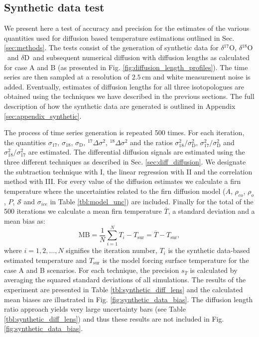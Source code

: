 \documentclass[11pt, draftcls, onecolumn]{IEEEtran} %
\numberwithin{equation}{section}
\numberwithin{table}{section}
\numberwithin{figure}{section}
\newcommand{\delOx}{$\delta{}^{18}\mathrm{O}$}
\newcommand{\delOxb}{$\delta{}^{17}\mathrm{O}$}
\newcommand{\delD}{$\delta\mathrm{D}$}
\begin{document}
\subsection{Synthetic data test} \label{sec:synthetic_results}
We present here a test of accuracy and precision for the estimates of the various 
quantities used for diffusion based temperature estimations outlined in Sec. \ref{sec:methods}. The tests consist of the generation of
synthetic data for \delOxb, \delOx~and \delD~and subsequent numerical diffusion with diffusion 
lengths as calculated for case A and B (as presented in Fig. \ref{fig:diffusion_length_profiles}).
The time series are then sampled at a resolution of $2.5\,\mathrm{cm}$ and white measurement noise is added. Eventually,
estimates of diffusion lengths for all three isotopologues are obtained using the techniques we have described 
in the previous sections. The full description of how the synthetic data are generated is outlined in Appendix \ref{sec:appendix_synthetic}.

The process of time series generation is repeated 500 times. 
For each iteration, the quantities $\sigma_{17}$, $\sigma_{18}$,
$\sigma_\mathrm{D}$, ${}^{17}\Delta\sigma^2$, ${}^{18}\Delta\sigma^2$ and 
the ratios $\sigma^2_{18}/\sigma^2_{\mathrm{D}}$,
$\sigma^2_{17}/\sigma^2_{\mathrm{D}}$ and $\sigma^2_{18}/\sigma^2_{17}$ are estimated. 
The differential diffusion signals are estimated 
using the three different techniques as described in Sec. \ref{sec:diff_diffusion}.
We designate the subtraction technique with
I, the linear regression with II and the correlation method with III. 
For every value of the diffusion estimates we calculate a firn temperature where
the uncertainties related to the firn diffusion model ($A$, $\rho_{co}$, $\rho_o$, $P$, $\mathcal{S}$ and $\sigma_{ice}$ in Table \ref{tbl:model_unc}) are included. 
Finally for the total of the 500 iterations we calculate a mean firn temperature $\overline{T}$, 
a standard deviation and a mean bias as: 
\begin{equation}
\text{MB} = \frac{1}{N} \sum_{i = 1}^{N} T_i - T_{\text{sur}} = \overline{T} - T_{\text{sur}},
\end{equation}
where $i = 1,2,\dots,N$ signifies the iteration number, $T_i$ is the synthetic 
data-based estimated temperature and $T_{\text{sur}}$ is the model forcing  
surface temperature for the case A and B scenarios.
For each technique, the precision $s_{\bar{T}}$ is calculated by averaging 
the squared standard deviations of all simulations. 
The results of the experiment are presented in Table \ref{tbl:synthetic_diff_lens} and the calculated 
mean biases are illustrated in Fig. \ref{fig:synthetic_data_bias}.
The diffusion length ratio approach yields very large uncertainty bars (see Table \ref{tbl:synthetic_diff_lens}) and thus these results are not 
included in Fig. \ref{fig:synthetic_data_bias}. 
\end{document}
